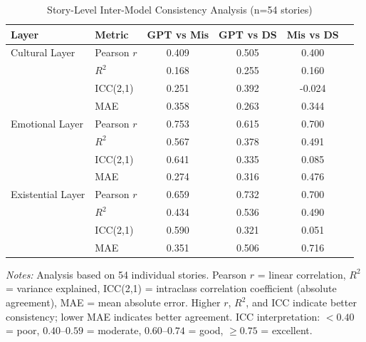 
\begin{table}[t]
\centering
\caption{Story-Level Inter-Model Consistency Analysis (n=54 stories)}
\label{tab:story_level_consistency}
\small
\begin{tabular}{llcccc}
\toprule
\textbf{Layer} & \textbf{Metric} & \textbf{GPT vs Mis} & \textbf{GPT vs DS} & \textbf{Mis vs DS} \\
\midrule
Cultural Layer     & Pearson $r$ & 0.409 & 0.505 & 0.400 \\
                   & $R^2$ & 0.168 & 0.255 & 0.160 \\
                   & ICC(2,1) & 0.251 & 0.392 & -0.024 \\
                   & MAE & 0.358 & 0.263 & 0.344 \\
\midrule
Emotional Layer    & Pearson $r$ & 0.753 & 0.615 & 0.700 \\
                   & $R^2$ & 0.567 & 0.378 & 0.491 \\
                   & ICC(2,1) & 0.641 & 0.335 & 0.085 \\
                   & MAE & 0.274 & 0.316 & 0.476 \\
\midrule
Existential Layer  & Pearson $r$ & 0.659 & 0.732 & 0.700 \\
                   & $R^2$ & 0.434 & 0.536 & 0.490 \\
                   & ICC(2,1) & 0.590 & 0.321 & 0.051 \\
                   & MAE & 0.351 & 0.506 & 0.716 \\
\bottomrule
\end{tabular}
\vspace{0.1cm}

\small
\textit{Notes:} Analysis based on 54 individual stories. Pearson $r$ = linear correlation, $R^2$ = variance explained,
ICC(2,1) = intraclass correlation coefficient (absolute agreement), MAE = mean absolute error.
Higher $r$, $R^2$, and ICC indicate better consistency; lower MAE indicates better agreement.
ICC interpretation: $<0.40$ = poor, $0.40$--$0.59$ = moderate, $0.60$--$0.74$ = good, $\geq 0.75$ = excellent.
\end{table}
